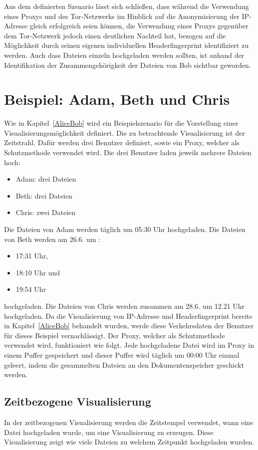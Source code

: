 \documentclass[
    fontsize=12pt,
    headings=small,
    parskip=half,           %
    bibliography=totoc,
    numbers=noenddot,       %
    open=any,               %
    ]{scrreprt}
\begin{document}
Aus dem definierten Szenario lässt sich schließen, dass während die Verwendung eines Proxys und des Tor-Netzwerks im Hinblick auf die Anonymisierung der IP-Adresse gleich erfolgreich seien können, die Verwendung eines Proxys gegenüber dem Tor-Netzwerk jedoch einen deutlichen Nachteil hat, bezogen auf die Möglichkeit durch seinen eigenen individuellen Headerfingerprint identifiziert zu werden.
Auch dass Dateien einzeln hochgeladen werden sollten, ist anhand der Identifikation der Zusammengehörigkeit der Dateien von Bob sichtbar geworden. 

\section{Beispiel: Adam, Beth und Chris} \label{Kap:ABC}
Wie in Kapitel~\ref{AliceBob} wird ein Beispielszenario für die Vorstellung einer Visualisierungsmöglichkeit definiert.
Die zu betrachtende Visualisierung ist der Zeitstrahl.
Dafür werden drei Benutzer definiert, sowie ein Proxy, welcher als Schutzmethode verwendet wird.
Die drei Benutzer laden jeweils mehrere Dateien hoch:
\begin{itemize}
\item Adam: drei Dateien
\item Beth: drei Dateien
\item Chris: zwei Dateien
\end{itemize}
Die Dateien von Adam werden täglich um 05:30 Uhr hochgeladen.
Die Dateien von Beth werden am 26.6. um :
\begin{itemize}
\item 17:31 Uhr,
\item 18:10 Uhr und
\item 19:54 Uhr
\end{itemize}
hochgeladen.
Die Dateien von Chris werden zusammen am 28.6. um 12.21 Uhr hochgeladen.
Da die Visualisierung von IP-Adresse und Headerfingerprint bereits in Kapitel~\ref{AliceBob} behandelt wurden, werde diese Verkehrsdaten der Benutzer für dieses Beispiel vernachlässigt.
Der Proxy, welcher als Schutzmethode verwendet wird, funktioniert wie folgt.
Jede hochgeladene Datei wird im Proxy in einem Puffer gespeichert und dieser Puffer wird täglich um 00:00 Uhr einmal geleert, indem die gesammelten Dateien an den Dokumentenspeicher geschickt werden. 

\subsection{Zeitbezogene Visualisierung}
In der zeitbezogenen Visualisierung werden die Zeitstempel verwendet, wann eine Datei hochgeladen wurde, um eine Visualisierung zu erzeugen.
Diese Visualisierung zeigt wie viele Dateien zu welchem Zeitpunkt hochgeladen wurden.
\end{document}

